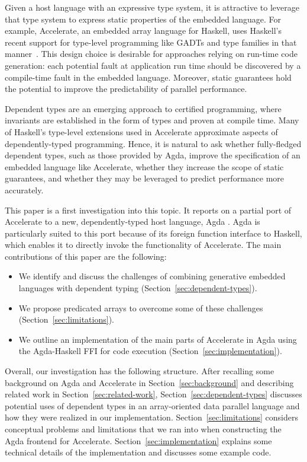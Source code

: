 \documentclass{llncs}
\begin{document}
Given a host language with an expressive type system, it is
attractive to leverage that type system to express static properties
of the embedded language. For example, Accelerate, an embedded array
language for Haskell, uses Haskell's recent support for type-level
programming like GADTs and type families in that
manner~\cite{ChakravartyKellerLeeMcdonellGrover2011}. This design
choice is desirable for approaches relying on run-time code
generation:
each  potential fault at application run time should be discovered by
a compile-time fault in the embedded language. Moreover, static guarantees
hold the potential to improve the predictability of parallel
performance. 

Dependent types are an emerging approach to certified programming, where invariants are established in the form of types and proven at compile time. Many of Haskell's type-level extensions used in Accelerate approximate aspects of dependently-typed programming. Hence, it is natural to ask whether fully-fledged dependent types, such as those provided by Agda, improve the specification of an embedded language like Accelerate, whether they increase the scope of static guarantees, and whether they may be leveraged to predict performance more accurately.

This paper is a first investigation into this topic. It reports on a
partial port of Accelerate to a new, dependently-typed host language,
Agda \cite{Norell2008,BoveDybjerNorell2009}. Agda is particularly
suited to this port because of its foreign function interface to
Haskell, which enables it to directly invoke the functionality of
Accelerate. The main contributions of this paper are the following:
%
\begin{itemize}
\item We identify and discuss the challenges of combining generative embedded languages with dependent typing (Section~\ref{sec:dependent-types}).
\item We propose predicated arrays to overcome some of these challenges (Section~\ref{sec:limitations}).
\item We outline an implementation of the main parts of Accelerate in Agda using the Agda-Haskell FFI for code execution (Section~\ref{sec:implementation}).
\end{itemize}
%
Overall, our investigation has the following structure. After recalling some
background on Agda and Accelerate in Section~\ref{sec:background} and
describing related work in Section~\ref{sec:related-work}, 
Section~\ref{sec:dependent-types} discusses potential uses of
dependent types in an array-oriented data parallel language and how they were realized in our
implementation. Section~\ref{sec:limitations} considers conceptual 
problems and limitations that we ran into when constructing the Agda
frontend for Accelerate. Section~\ref{sec:implementation} explains
some technical details of the implementation and discusses some
example code. 
\end{document}
